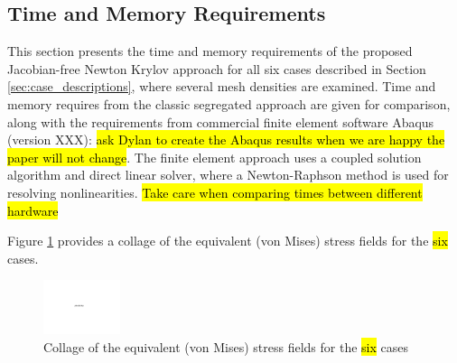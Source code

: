 \documentclass[sn-mathphys,Numbered]{sn-jnl}%
\begin{document}
\subsection{Time and Memory Requirements}
This section presents the time and memory requirements of the proposed Jacobian-free Newton Krylov approach for all six cases described in Section \ref{sec:case_descriptions}, where several mesh densities are examined.
Time and memory requires from the classic segregated approach are given for comparison, along with the requirements from commercial finite element software Abaqus (version XXX): \hl{ask Dylan to create the Abaqus results when we are happy the paper will not change}.
The finite element approach uses a coupled solution algorithm and direct linear solver, where a Newton-Raphson method is used for resolving nonlinearities.
\hl{Take care when comparing times between different hardware}

Figure \ref{fig:time_memory_images} provides a collage of the equivalent (von Mises) stress fields for the \hl{six} cases.
\begin{figure}[htbp]
   \centering
   \includegraphics[width=0.2\textwidth]{figures/placeholder.pdf} 
   \caption{Collage of the equivalent (von Mises) stress fields for the \hl{six} cases}
   \label{fig:time_memory_images}
\end{figure}
\end{document}
